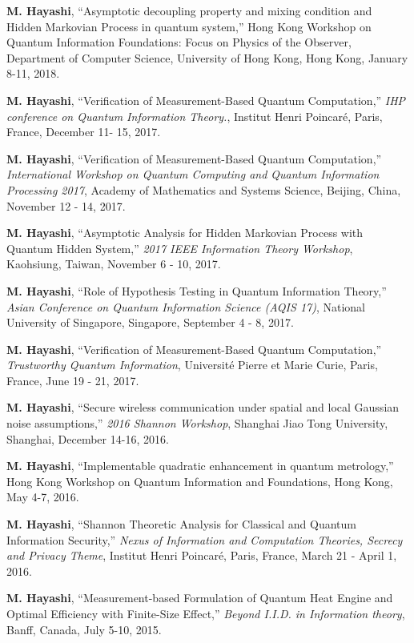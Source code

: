 \documentclass[a4paper,12pt,oneside]{article}
\begin{document}
\begin{enumerate}
\textbf{M. Hayashi}, ``Asymptotic decoupling property and mixing condition 
and Hidden Markovian Process in quantum system,'' 
Hong Kong Workshop on Quantum Information Foundations:
Focus on Physics of the Observer, 
Department of Computer Science, University of Hong Kong, 
Hong Kong, January 8-11, 2018.

\textbf{M. Hayashi}, ``Verification of Measurement-Based Quantum Computation,'' 
{\em IHP conference on Quantum Information Theory.}, 
Institut Henri Poincar\'{e},
Paris, France, December 11- 15, 2017.

\textbf{M. Hayashi}, ``Verification of Measurement-Based Quantum Computation,'' 
{\em International Workshop on Quantum Computing and Quantum Information Processing 2017}, 
Academy of Mathematics and Systems Science, Beijing, China, November 12 - 14, 2017.

\textbf{M. Hayashi}, ``Asymptotic Analysis for Hidden Markovian Process with Quantum Hidden System,'' 
{\em 2017 IEEE Information Theory Workshop}, 
Kaohsiung, Taiwan, November 6 - 10, 2017.

\textbf{M. Hayashi}, ``Role of Hypothesis Testing in Quantum Information Theory,'' 
{\em Asian Conference on Quantum Information Science (AQIS 17)}, 
National University of Singapore, Singapore, September 4 - 8, 2017.


\textbf{M. Hayashi}, ``Verification of Measurement-Based Quantum Computation,'' 
{\em Trustworthy Quantum Information}, 
Universit\'{e} Pierre et Marie Curie, Paris, France, June 19 - 21, 2017.

\textbf{M. Hayashi}, 
``Secure wireless communication under spatial and local Gaussian noise assumptions,'' 
{\em 2016 Shannon Workshop}, Shanghai Jiao Tong University, Shanghai, December 14-16, 2016.


\textbf{M. Hayashi}, ``Implementable quadratic enhancement in quantum metrology,'' 
Hong Kong Workshop on Quantum Information and Foundations, Hong Kong, May 4-7, 2016.


\textbf{M. Hayashi}, ``Shannon Theoretic Analysis for Classical and Quantum Information Security,'' 
{\em Nexus of Information and Computation Theories, Secrecy and Privacy Theme}, 
Institut Henri Poincar\'{e}, Paris, France, March 21 - April 1, 2016.



\textbf{M. Hayashi}, ``Measurement-based Formulation of Quantum Heat Engine and Optimal Efficiency with Finite-Size Effect,'' 
{\em Beyond I.I.D. in Information theory}, Banff, Canada, July 5-10, 2015.


\end{enumerate}
\end{document}
